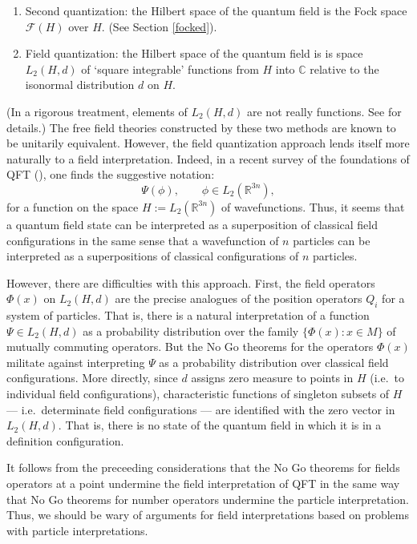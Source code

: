 \documentclass[11pt]{article}
\theoremstyle{definition}
\theoremstyle{definition}
\theoremstyle{remark}
\def\2#1{{\mathcal #1}}
\def\7#1{{\mathbb #1}}
\begin{document}
\begin{enumerate}
\item Second quantization: the Hilbert space of the quantum field is
  the Fock space $\2F (H)$ over $H$.  (See Section \ref{focked}).
\item Field quantization: the Hilbert space of the quantum field is is
  space $L_2(H ,d)$ of `square integrable' functions from $H$ into
  $\7C$ relative to the isonormal distribution $d$ on $H$.

\end{enumerate}
(In a rigorous treatment, elements of $L_2(H,d )$ are not really
functions.  See \cite[Section 1.3]{baez} for details.)  The free field
theories constructed by these two methods are known to be unitarily
equivalent.  However, the field quantization approach lends itself
more naturally to a field interpretation.  Indeed, in a recent survey
of the foundations of QFT (\cite{nhug}), one finds the suggestive
notation:
\[ \Psi (\phi ),\qquad \phi \in L_2(\7R ^{3n}) ,\] for a function on
the space $H:=L_2(\7R ^{3n})$ of wavefunctions. Thus, it seems that a
quantum field state can be interpreted as a superposition of classical
field configurations in the same sense that a wavefunction of $n$
particles can be interpreted as a superpositions of classical
configurations of $n$ particles.

However, there are difficulties with this approach.  First, the field
operators $\Phi (x)$ on $L_2(H ,d)$ are the precise analogues of the
position operators $Q_i$ for a system of particles.  That is, there is
a natural interpretation of a function $\Psi \in L_2(H, d)$ as a
probability distribution over the family $\{ \Phi (x):x\in M\}$ of
mutually commuting operators.  But the No Go theorems for the
operators $\Phi (x)$ militate against interpreting $\Psi$ as a
probability distribution over classical field configurations.  More
directly, since $d$ assigns zero measure to points in $H$ (i.e.\ to
individual field configurations), characteristic functions of
singleton subsets of $H$ --- i.e.\ determinate field configurations
--- are identified with the zero vector in $L_2(H ,d)$.  That is,
there is no state of the quantum field in which it is in a definition
configuration.

It follows from the preceeding considerations that the No Go theorems
for fields operators at a point undermine the field interpretation of
QFT in the same way that No Go theorems for number operators undermine
the particle interpretation.  Thus, we should be wary of arguments for
field interpretations based on problems with particle interpretations.    
\end{document}
